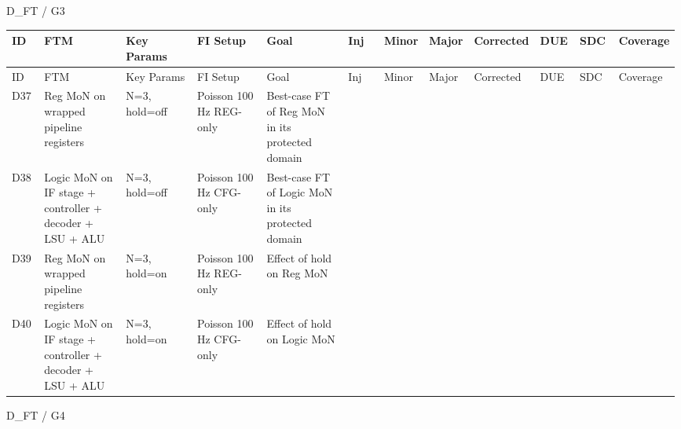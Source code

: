 D\_FT / G3

\begin{longtable}{|p{0.05\linewidth}|p{0.14\linewidth}|p{0.12\linewidth}|p{0.12\linewidth}|p{0.14\linewidth}|p{0.06\linewidth}|p{0.06\linewidth}|p{0.06\linewidth}|p{0.06\linewidth}|p{0.06\linewidth}|p{0.06\linewidth}|p{0.06\linewidth}|}
\hline
ID & FTM & Key Params & FI Setup & Goal & Inj & Minor & Major & Corrected & DUE & SDC & Coverage \\
\hline
\endfirsthead
\hline
ID & FTM & Key Params & FI Setup & Goal & Inj & Minor & Major & Corrected & DUE & SDC & Coverage \\
\hline
\endhead
D37 & Reg MoN on wrapped pipeline registers & N=3, hold=off & Poisson 100 Hz \textbar{} REG-only & Best-case FT of Reg MoN in its protected domain &  &  &  &  &  &  &  \\
\hline
D38 & Logic MoN on IF stage + controller + decoder + LSU + ALU & N=3, hold=off & Poisson 100 Hz \textbar{} CFG-only & Best-case FT of Logic MoN in its protected domain &  &  &  &  &  &  &  \\
\hline
D39 & Reg MoN on wrapped pipeline registers & N=3, hold=on & Poisson 100 Hz \textbar{} REG-only & Effect of hold on Reg MoN &  &  &  &  &  &  &  \\
\hline
D40 & Logic MoN on IF stage + controller + decoder + LSU + ALU & N=3, hold=on & Poisson 100 Hz \textbar{} CFG-only & Effect of hold on Logic MoN &  &  &  &  &  &  &  \\
\hline
\end{longtable}

D\_FT / G4

